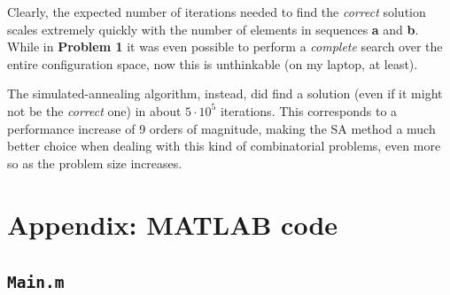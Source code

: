 \documentclass[12pt,A4,titlepage]{article}
\begin{document}
Clearly, the expected number of iterations needed to find the \emph{correct} solution scales extremely quickly with the number of elements in sequences \textbf{a} and \textbf{b}. While in \textbf{Problem 1} it was even possible to perform a \emph{complete} search over the entire configuration space, now this is unthinkable (on my laptop, at least).

The simulated-annealing algorithm, instead, did find a solution (even if it might not be the \emph{correct} one) in about $5\cdot10^5$ iterations. This corresponds to a performance increase of 9 orders of magnitude, making the SA method a much better choice when dealing with this kind of combinatorial problems, even more so as the problem size increases.
 
\clearpage

\appendix








\section*{Appendix: MATLAB code}

\subsection*{\texttt{Main.m}}
\end{document}
